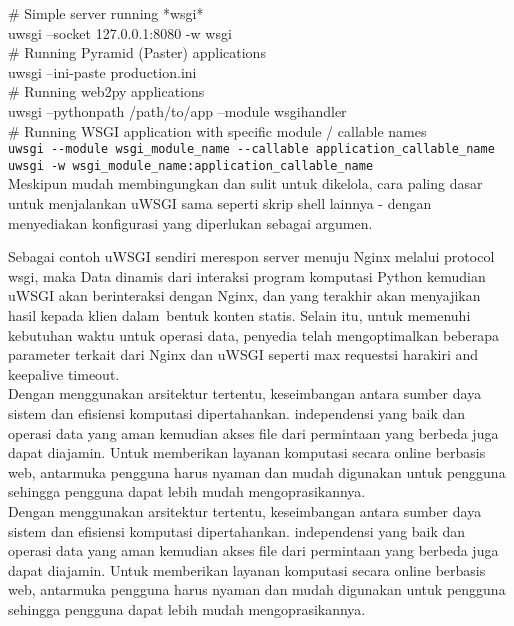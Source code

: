 \documentclass[12pt, times new roman, a4paper]{Article}
\begin{document}
\begin{enumerate}
\# Simple server running *wsgi*\\
uwsgi --socket 127.0.0.1:8080 -w wsgi\\

\# Running Pyramid (Paster) applications\\
uwsgi --ini-paste production.ini\\

\# Running web2py applications\\
uwsgi --pythonpath /path/to/app --module wsgihandler\\

\# Running WSGI application with specific module / callable names\\
\verb|uwsgi --module wsgi_module_name --callable application_callable_name|\\
\verb|uwsgi -w wsgi_module_name:application_callable_name|\\
Meskipun mudah membingungkan dan sulit untuk dikelola, cara paling dasar untuk menjalankan uWSGI sama seperti skrip shell lainnya - dengan menyediakan konfigurasi yang diperlukan sebagai argumen\cite{cencini2017data}.\\




\end{enumerate}
Sebagai contoh uWSGI sendiri merespon server menuju Nginx melalui protocol wsgi, maka Data dinamis dari interaksi program
komputasi Python kemudian uWSGI akan berinteraksi dengan Nginx, dan yang terakhir akan menyajikan hasil kepada klien dalam\
bentuk konten statis. Selain itu, untuk memenuhi kebutuhan waktu untuk operasi data, penyedia  telah mengoptimalkan beberapa
parameter terkait dari Nginx dan uWSGI seperti max requestsi harakiri and keepalive timeout.\\

	Dengan menggunakan arsitektur tertentu, keseimbangan antara sumber daya sistem dan efisiensi komputasi dipertahankan. independensi yang baik dan operasi data yang aman kemudian  akses file dari permintaan yang berbeda juga dapat diajamin. Untuk memberikan layanan komputasi secara online berbasis web, antarmuka pengguna harus nyaman dan mudah digunakan untuk pengguna sehingga pengguna dapat lebih mudah mengoprasikannya\cite{dong2015chemdes}.\\

	Dengan menggunakan arsitektur tertentu, keseimbangan antara sumber daya sistem dan efisiensi komputasi dipertahankan. independensi yang baik dan operasi data yang aman kemudian  akses file dari permintaan yang berbeda juga dapat diajamin. Untuk memberikan layanan komputasi secara online berbasis web, antarmuka pengguna harus nyaman dan mudah digunakan untuk pengguna sehingga pengguna dapat lebih mudah mengoprasikannya\cite{dong2015chemdes}.\\
	
\end{document}
